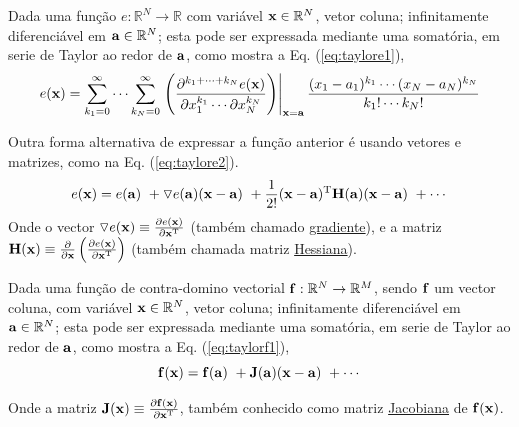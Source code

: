  
\begin{proposition}\label{prop:taylore}
Dada uma função $e:\mathbb{R}^{N}\rightarrow \mathbb{R}$ com variável $\VECTOR{x} \in \mathbb{R}^{N}$, vetor coluna;
infinitamente diferenciável em $\VECTOR{a} \in \mathbb{R}^{N}$;
esta pode ser expressada mediante uma somatória, em serie de Taylor \cite{Taylor} \FALTAREFERENCIA ao redor de $\VECTOR{a}$, como
mostra a Eq. (\ref{eq:taylore1}),
\begin{equation}\label{eq:taylore1}
e(\VECTOR{x}) =\sum _{k_{1}=0}^{\infty }\cdots \sum _{k_{N}=0}^{\infty }\left.\left({\frac {\partial ^{k_{1}+\cdots +k_{N}}e(\VECTOR{x})}{\partial x_{1}^{k_{1}}\cdots \partial x_{N}^{k_{N}}}}\right)\right|_{\VECTOR{x}=\VECTOR{a}} {\frac {(x_{1}-a_{1})^{k_{1}}\cdots (x_{N}-a_{N})^{k_{N}}}{k_{1}!\cdots k_{N}!}}
\end{equation}

Outra forma alternativa de expressar a função anterior é usando vetores e matrizes,
como na Eq. (\ref{eq:taylore2}).
\begin{equation}\label{eq:taylore2}
  e(\VECTOR{x})=e(\VECTOR{a})
      ~+ \triangledown e(\VECTOR{a}) (\VECTOR{x}-\VECTOR{a})
      ~+\frac{1}{2!}(\VECTOR{x}-\VECTOR{a})^{\transpose} \MATRIX{H(\VECTOR{a})}  (\VECTOR{x}-\VECTOR{a})
      ~+\cdots 
\end{equation}
Onde o vector $\triangledown e(\VECTOR{x})\equiv \frac{\partial e(\VECTOR{x})}{\partial \VECTOR{x}^{\transpose} }$ 
(também chamado \hyperref[def:gradient]{gradiente}),
e a matriz $\MATRIX{H}(\VECTOR{x})\equiv \frac{\partial }{\partial \VECTOR{x}} \left( \frac{\partial e(\VECTOR{x})}{ \partial \VECTOR{x}^{\transpose} }\right)$
(também chamada matriz \hyperref[def:hessian]{Hessiana}).
\end{proposition}

\begin{proposition}\label{prop:taylorf}
Dada uma função de contra-domino vectorial $\VECTOR{f}:\mathbb{R}^{N}\rightarrow \mathbb{R}^{M}$, 
sendo $\VECTOR{f}$ um vector coluna, com variável $\VECTOR{x} \in \mathbb{R}^{N}$, vetor coluna;
infinitamente diferenciável em $\VECTOR{a} \in \mathbb{R}^{N}$;
esta pode ser expressada mediante uma somatória, em serie de Taylor \cite{Taylor} \FALTAREFERENCIA ao redor de $\VECTOR{a}$, como
mostra a Eq. (\ref{eq:taylorf1}),
\begin{equation}\label{eq:taylorf1}
\VECTOR{f}(\VECTOR{x}) =\VECTOR{f}(\VECTOR{a})
      ~+ \MATRIX{J}(\VECTOR{a}) (\VECTOR{x}-\VECTOR{a})
      ~+\cdots 
\end{equation}

Onde a matriz $\MATRIX{J}(\VECTOR{x})\equiv \frac{\partial \VECTOR{f}(\VECTOR{x})}{\partial \VECTOR{x}^{\transpose} }$,
também conhecido como matriz \hyperref[def:jacobian]{Jacobiana} de $\VECTOR{f}(\VECTOR{x})$.
\end{proposition}
